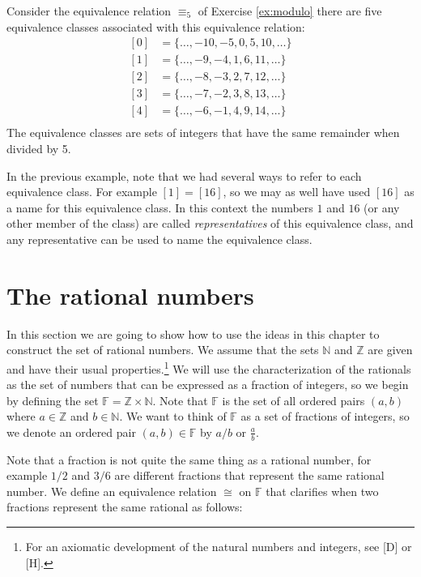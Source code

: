 \begin{example}
Consider the equivalence relation $\equiv_5$ of Exercise \ref{ex:modulo} there are five equivalence classes associated with this equivalence relation:
\begin{equation*}
\begin{split}
[0] &=\{\ldots,-10,-5,0,5,10,\ldots\}\\
[1] &=\{\ldots,-9,-4,1,6,11,\ldots\}\\
[2] &=\{\ldots,-8,-3,2,7,12,\ldots\}\\
[3] &=\{\ldots,-7,-2,3,8,13,\ldots\}\\
[4] &=\{\ldots,-6,-1,4,9,14,\ldots\}\\
\end{split}
\end{equation*}
The equivalence classes are sets of integers that have the same remainder when divided by 5.
\end{example}

In the previous example, note that we had several ways to refer to each equivalence class.  For example $[1]=[16]$, so we may as well have used $[16]$ as a name for this equivalence class.  In this context the numbers $1$ and $16$ (or any other member of the class) are called \emph{representatives} of this equivalence class, and any representative can be used to name the equivalence class.

\section{The rational numbers}

In this section we are going to show how to use the ideas in this chapter to construct the set of rational numbers. We assume that the sets $\mathbb N$ and $\mathbb Z$ are given and have their usual properties.\footnote{For an axiomatic development of the natural numbers and integers, see [D] or [H].} We will use the characterization of the rationals as the set of numbers that can be expressed as a fraction of integers, so we begin by defining the set $\mathbb F=\mathbb Z\times\mathbb N$. Note that $\mathbb F$ is the set of all ordered pairs $(a,b)$ where $a\in\mathbb Z$ and $b\in\mathbb N$. We want to think of $\mathbb F$ as a set of fractions of integers, so we denote an ordered pair $(a,b)\in\mathbb F$ by $a/b$ or $\frac ab$. 

Note that a fraction is not quite the same thing as a rational number, for example $1/2$ and $3/6$ are different fractions that represent the same rational number. We define an equivalence relation $\cong$  on $\mathbb F$ that clarifies when two fractions represent the same rational as follows:


